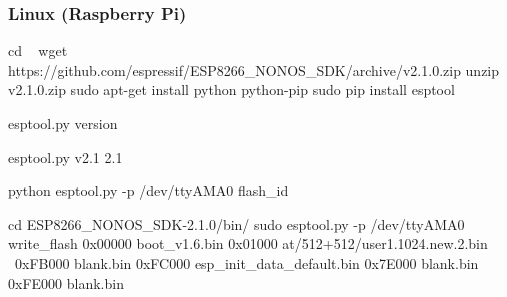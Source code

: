 
\subsubsection{Linux (Raspberry Pi)}

\begin{console}
cd ~
wget https://github.com/espressif/ESP8266_NONOS_SDK/archive/v2.1.0.zip
unzip v2.1.0.zip
sudo apt-get install python python-pip
sudo pip install esptool
\end{console}



\begin{console}
esptool.py version
\end{console}

\begin{screensmall}
esptool.py v2.1
2.1
\end{screensmall}

\begin{console}
python esptool.py -p /dev/ttyAMA0 flash_id 
\end{console}


\begin{console}
cd ESP8266_NONOS_SDK-2.1.0/bin/
sudo esptool.py -p /dev/ttyAMA0 write_flash 0x00000 boot_v1.6.bin 0x01000 at/512+512/user1.1024.new.2.bin \
 0xFB000 blank.bin 0xFC000 esp_init_data_default.bin 0x7E000 blank.bin 0xFE000 blank.bin 
\end{console}

